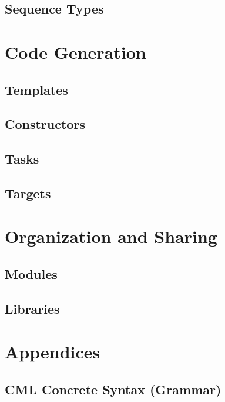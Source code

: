 \documentclass[a4paper,oneside,12pt, extrafontsizes]{memoir}
\begin{document}
\chapter{Sequence Types}
\label{ch:sequence-types}

\part{Code Generation}

\chapter{Templates}
\label{sec:templates}

\chapter{Constructors}
\label{sec:constructors}

\chapter{Tasks}
\label{sec:tasks}

\chapter{Targets}
\label{sec:targets}

\part{Organization and Sharing}

\chapter{Modules}
\label{ch:modules}

\chapter{Libraries}
\label{ch:libraries}

\part{Appendices}

\appendix

\chapter{CML Concrete Syntax (Grammar)}
\label{apx:concrete-syntax}

\end{document}
